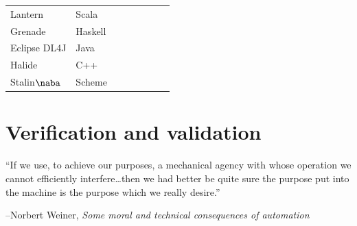 \documentclass[12pt,initial,twoside,maitrise]{dms}
\newcommand{\cmark}{\textcolor{green!80!black}{\ding{51}}}
\newcommand{\xmark}{\textcolor{red}{\ding{55}}}
\numberwithin{equation}{section}
\numberwithin{table}{chapter}
\numberwithin{figure}{chapter}
\begin{document}
\begin{center}
\begin{tabular}{llllllll}
Lantern                    & Scala    & \cmark & \cmark                                                 & \cmark                                                 & \xmark                                                          & \cmark                                               & \xmark                                                                \\
Grenade                    & Haskell  & \cmark & \cmark                                                 & \cmark                                                 & \cmark                                         & \xmark                                                                & \xmark                                                                \\
Eclipse DL4J                          & Java     & \cmark & \xmark                                                                  & \cmark                                                 & \xmark                                                          & \xmark                                                                & \xmark                                                                \\
Halide                                    & C++      & \cmark & \xmark                                                                  & \cmark                                                 & \xmark                                                          & \cmark                                               & \xmark                                                                \\
Stalin$\naba$         & Scheme   & \cmark & \cmark & \xmark & \xmark & \xmark & \xmark \\
\end{tabular}
\end{center}

\chapter{Verification and validation}\label{ch:difftest}

\setlength{\epigraphwidth}{0.78\textwidth}
\epigraph{``If we use, to achieve our purposes, a mechanical agency with whose operation we cannot efficiently interfere\ldots then we had better be quite sure the purpose put into the machine is the purpose which we really desire.''}{\begin{flushright}--Norbert Weiner, \textit{Some moral and technical consequences of automation}~\cite{wiener1960some}\end{flushright}}
\end{document}
